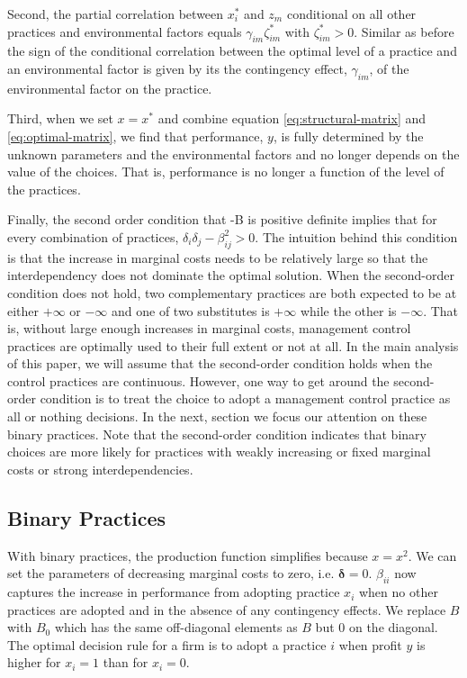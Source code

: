 \documentclass[12pt]{article}
\begin{document}
Second, the partial correlation between $x^*_i$ and $z_m$ conditional on all other practices and environmental factors equals $\gamma_{im} \zeta_{im}^*$ with $\zeta_{im}^* > 0$. Similar as before the sign of the conditional correlation between the optimal level of a practice and an environmental factor is given by its the contingency effect, $\gamma_{im}$, of the environmental factor on the practice. 

Third, when we set $x = x^*$ and combine equation \eqref{eq:structural-matrix} and \eqref{eq:optimal-matrix}, we find that performance, $y$, is fully determined by the unknown parameters and the environmental factors and no longer depends on the value of the choices. That is, performance is no longer a function of the level of the practices. 

Finally, the second order condition that -B is positive definite implies that for every combination of practices, $\delta_i \delta_j - \beta_{ij}^2 > 0$. The intuition behind this condition is that the increase in marginal costs needs to be relatively large so that the interdependency does not dominate the optimal solution. When the second-order condition does not hold, two complementary practices are both expected to be at either \(+\infty\) or \(-\infty\) and one of two substitutes is \(+\infty\) while the other is \(-\infty\). That is, without large enough increases in marginal costs, management control practices are optimally used to their full extent or not at all. In the main analysis of this paper, we will assume that the second-order condition holds when the control practices are continuous. However, one way to get around the second-order condition is to treat the choice to adopt a management control practice as all or nothing decisions. In the next, section we focus our attention on these binary practices. Note that the second-order condition indicates that binary choices are more likely for practices with weakly increasing or fixed marginal costs or strong interdependencies.

\subsection{Binary Practices}

With binary practices, the production function simplifies because $x = x^2$. We can set the parameters of decreasing marginal costs to zero, i.e. $\mathbf{\delta} = 0$. $\beta_{ii}$ now captures the increase in performance from adopting practice $x_i$ when no other practices are adopted and in the absence of any contingency effects. We replace $B$ with $B_0$ which has the same off-diagonal elements as $B$ but $0$ on the diagonal. The optimal decision rule for a firm is to adopt a practice $i$ when profit $y$ is higher for $x_i = 1$ than for $x_i = 0$. 
\end{document}
